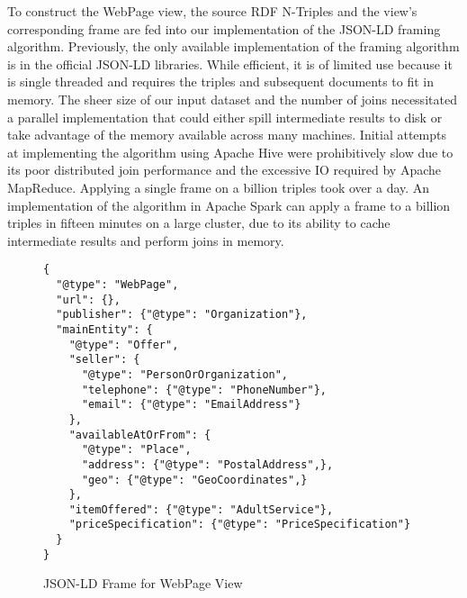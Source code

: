 To construct the WebPage view, the source RDF N-Triples and the view's corresponding frame are fed into our implementation of the JSON-LD framing algorithm.  
Previously, the only available implementation of the framing algorithm is in the official JSON-LD libraries.  
While efficient, it is of limited use because it  is single threaded and requires the triples and subsequent documents to fit in memory.
The sheer size of our input dataset and the number of joins necessitated a parallel implementation that could either spill intermediate results to disk or take advantage of the memory available across many machines. 
Initial attempts at implementing the algorithm using Apache Hive were prohibitively slow due to its poor distributed join performance and the excessive IO required by Apache MapReduce.  Applying a single frame on a billion triples took over a day.  
An implementation of the algorithm in Apache Spark can apply a frame to a billion triples in fifteen minutes on a large cluster, due to its ability to cache intermediate results and perform joins in memory.   
\begin{figure}
\vspace{-0.2cm}
\begin{verbatim}
{
  "@type": "WebPage",
  "url": {},
  "publisher": {"@type": "Organization"},
  "mainEntity": {
    "@type": "Offer",
    "seller": {
      "@type": "PersonOrOrganization",
      "telephone": {"@type": "PhoneNumber"},
      "email": {"@type": "EmailAddress"}
    },
    "availableAtOrFrom": {
      "@type": "Place",
      "address": {"@type": "PostalAddress",},
      "geo": {"@type": "GeoCoordinates",}
    },
    "itemOffered": {"@type": "AdultService"},
    "priceSpecification": {"@type": "PriceSpecification"}
  }
}
\end{verbatim}
\caption{JSON-LD Frame for WebPage View}
\label{fig:json_ld_webpage_view}
\vspace{-0.2cm}
\end{figure}
